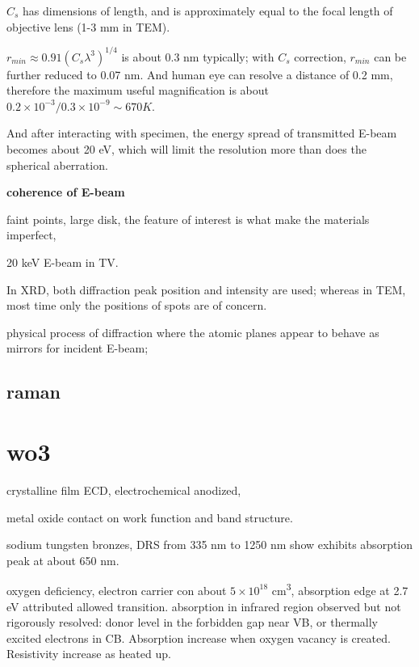 $C_s$ has dimensions of length, and is approximately equal to the focal length of objective lens (1-3 mm in TEM). 

$r_{min} \approx 0.91(C_s \lambda^3)^{1/4}$ is about 0.3 nm typically; with $C_s$ correction, $r_{min}$ can be further reduced to 0.07 nm. And human eye can resolve a distance of 0.2 mm, therefore the maximum useful magnification is about $0.2 \times 10^{-3}/0.3 \times 10^{-9} \sim 670 K$. 

And after interacting with specimen, the energy spread of transmitted E-beam becomes about 20 eV, which will limit the resolution more than does the spherical aberration. 

\textbf{coherence of E-beam}

faint points, large disk, the feature of interest is what make the materials imperfect, 

20 keV E-beam in TV. 

In XRD, both diffraction peak position and intensity are used; whereas in TEM, most time only the positions of spots are of concern. 

physical process of diffraction where the atomic planes appear to behave as mirrors for incident E-beam; 

\fi

\section{raman}


\iffalse
A Raman pattern database can be found at \url{http://wwwobs.univ-bpclermont.fr/sfmc/ramandb2/index.html}. 
In analytical practice, frequency is expressed in reciprocal wavelength (as cm−1), called wavenumbers;
\fi


\chapter{wo3}

 crystalline film ECD, electrochemical anodized, \cite{Ou2012}

metal oxide contact on work function and band structure.\cite{Greiner2013}

sodium tungsten bronzes, DRS from 335 nm to 1250 nm show  exhibits absorption peak at about 650 nm.\cite{Brown1954} 

oxygen deficiency, electron carrier con about $5\times10^{18}$ \si{cm^3}, absorption edge at 2.7 eV attributed allowed transition. absorption in infrared region observed but not rigorously resolved: donor level in the forbidden gap near VB, or thermally excited electrons in CB. Absorption increase when oxygen vacancy is created. Resistivity increase as heated up. \cite{Berak1970}

